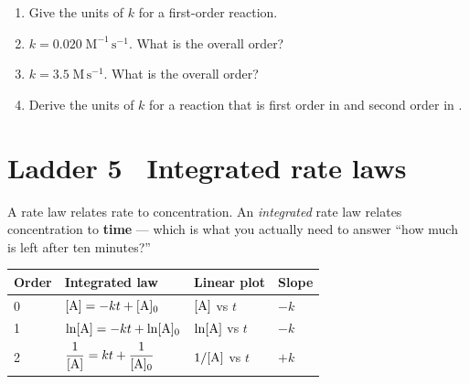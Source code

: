 \documentclass{apchem-worksheet}
\begin{document}
\begin{yourturn}
\begin{enumerate}[leftmargin=*,itemsep=0.5em]
  \item Give the units of $k$ for a first-order reaction.
        \workspace[1.4cm]
  \item $k = 0.020\;\mathrm{M^{-1}\,s^{-1}}$. What is the overall
        order? \workspace[1.4cm]
  \item $k = 3.5\;\mathrm{M\,s^{-1}}$. What is the overall order?
        \workspace[1.4cm]
  \item Derive the units of $k$ for a reaction that is first order in
         and second order in . \workspace[1.8cm]
\end{enumerate}
\end{yourturn}

\section*{\sffamily Ladder 5 \textbullet\ Integrated rate laws}

A rate law relates rate to concentration. An \emph{integrated} rate law
relates concentration to \textbf{time} --- which is what you actually
need to answer ``how much is left after ten minutes?''

\begin{center}
\renewcommand{\arraystretch}{1.5}
\begin{tabular}{@{}llll@{}}
\toprule
\textbf{Order} & \textbf{Integrated law} &
  \textbf{Linear plot} & \textbf{Slope} \\
\midrule
0 & $[\ce{A}] = -kt + [\ce{A}]_{0}$ &
  $[\ce{A}]$ vs $t$ & $-k$ \\
1 & $\ln[\ce{A}] = -kt + \ln[\ce{A}]_{0}$ &
  $\ln[\ce{A}]$ vs $t$ & $-k$ \\
2 & $\dfrac{1}{[\ce{A}]} = kt + \dfrac{1}{[\ce{A}]_{0}}$ &
  $1/[\ce{A}]$ vs $t$ & $+k$ \\
\bottomrule
\end{tabular}
\end{center}
\end{document}
